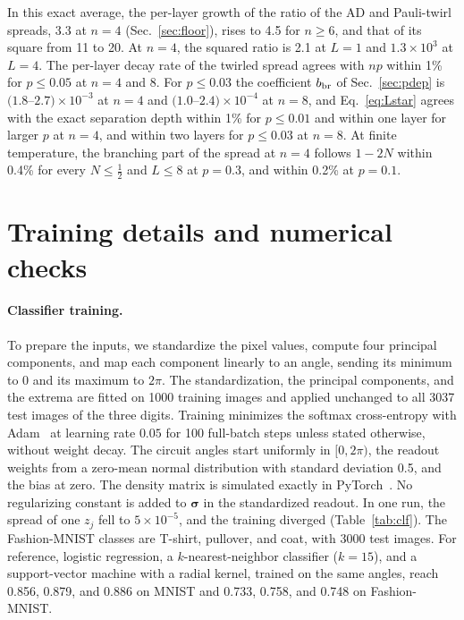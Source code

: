 \documentclass[
 aps,pra,
 twocolumn,
 superscriptaddress,
 longbibliography,
 nofootinbib
]{revtex4-2}
\begin{document}
In this exact average, the per-layer growth of the ratio of the AD and
Pauli-twirl spreads, 3.3 at $n=4$ (Sec.~\ref{sec:floor}), rises to 4.5 for
$n\ge6$, and that of its square from 11 to 20. At $n=4$, the squared ratio is
2.1 at $L=1$ and $1.3\times10^3$ at $L=4$. The per-layer decay rate of the
twirled spread agrees with $np$ within 1\% for $p\le0.05$ at $n=4$ and 8. For
$p\le0.03$ the coefficient $b_{\rm br}$ of Sec.~\ref{sec:pdep} is
$(1.8$--$2.7)\times10^{-3}$ at $n=4$ and $(1.0$--$2.4)\times10^{-4}$ at $n=8$, and
Eq.~\eqref{eq:Lstar} agrees with the exact separation depth within 1\% for
$p\le0.01$ and within one layer for larger $p$ at $n=4$, and within two layers
for $p\le0.03$ at $n=8$. At finite temperature, the branching part of the
spread at $n=4$ follows $1-2N$ within 0.4\% for every $N\le\frac12$ and
$L\le8$ at $p=0.3$, and within 0.2\% at $p=0.1$.

\section{Training details and numerical checks}
\label{app:training}

\paragraph{Classifier training.}
To prepare the inputs, we standardize the pixel values, compute four principal
components, and map each component linearly to an angle, sending its minimum
to 0 and its maximum to $2\pi$. The standardization, the principal components,
and the extrema are fitted on 1000 training images and applied unchanged to all
3037 test images of the three digits. Training minimizes the softmax cross-entropy with Adam~\cite{kingma2014adam} at
learning rate $0.05$ for 100 full-batch steps unless stated otherwise, without
weight decay. The circuit angles start uniformly in $[0,2\pi)$, the readout
weights from a zero-mean normal distribution with standard deviation 0.5, and
the bias at zero. The density matrix
is simulated exactly in PyTorch~\cite{paszke2019pytorch}. No regularizing
constant is added to $\boldsymbol\sigma$ in the standardized readout. In one
run, the spread of one $z_j$ fell to $5\times10^{-5}$, and the training diverged
(Table~\ref{tab:clf}). The Fashion-MNIST classes are T-shirt, pullover, and
coat, with 3000 test images. For reference, logistic regression, a
$k$-nearest-neighbor classifier ($k=15$), and a support-vector machine with a
radial kernel, trained on the same angles, reach 0.856, 0.879, and 0.886 on
MNIST and 0.733, 0.758, and 0.748 on Fashion-MNIST.
\end{document}
